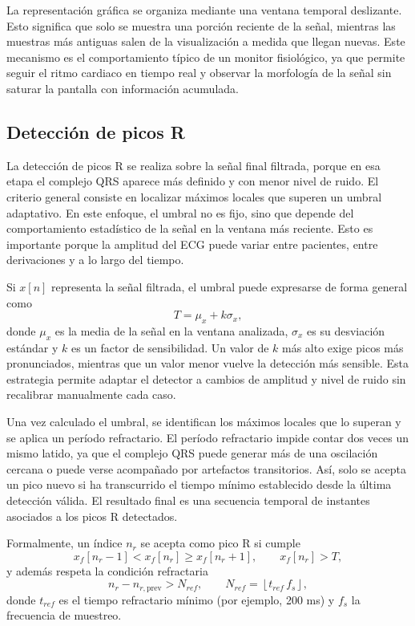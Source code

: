 La representación gráfica se organiza mediante una ventana temporal deslizante. Esto significa que solo se muestra una porción reciente de la señal, mientras las muestras más antiguas salen de la visualización a medida que llegan nuevas. Este mecanismo es el comportamiento típico de un monitor fisiológico, ya que permite seguir el ritmo cardiaco en tiempo real y observar la morfología de la señal sin saturar la pantalla con información acumulada.

\subsection{Detección de picos R}

La detección de picos R se realiza sobre la señal final filtrada, porque en esa etapa el complejo QRS aparece más definido y con menor nivel de ruido. El criterio general consiste en localizar máximos locales que superen un umbral adaptativo. En este enfoque, el umbral no es fijo, sino que depende del comportamiento estadístico de la señal en la ventana más reciente. Esto es importante porque la amplitud del ECG puede variar entre pacientes, entre derivaciones y a lo largo del tiempo.

Si $x[n]$ representa la señal filtrada, el umbral puede expresarse de forma general como
\[
T = \mu_x + k\sigma_x,
\]
donde $\mu_x$ es la media de la señal en la ventana analizada, $\sigma_x$ es su desviación estándar y $k$ es un factor de sensibilidad. Un valor de $k$ más alto exige picos más pronunciados, mientras que un valor menor vuelve la detección más sensible. Esta estrategia permite adaptar el detector a cambios de amplitud y nivel de ruido sin recalibrar manualmente cada caso.

Una vez calculado el umbral, se identifican los máximos locales que lo superan y se aplica un período refractario. El período refractario impide contar dos veces un mismo latido, ya que el complejo QRS puede generar más de una oscilación cercana o puede verse acompañado por artefactos transitorios. Así, solo se acepta un pico nuevo si ha transcurrido el tiempo mínimo establecido desde la última detección válida. El resultado final es una secuencia temporal de instantes asociados a los picos R detectados.

Formalmente, un índice $n_r$ se acepta como pico R si cumple
\[
x_f[n_r-1] < x_f[n_r] \ge x_f[n_r+1], \qquad x_f[n_r] > T,
\]
y además respeta la condición refractaria
\[
n_r-n_{r,\text{prev}} > N_{ref}, \qquad N_{ref}=\left\lfloor t_{ref}\,f_s\right\rfloor,
\]
donde $t_{ref}$ es el tiempo refractario mínimo (por ejemplo, 200 ms) y $f_s$ la frecuencia de muestreo.

